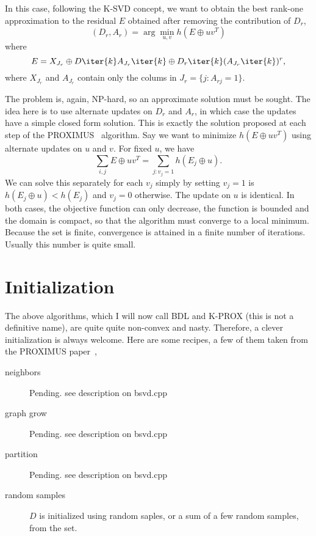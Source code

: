 \documentclass[a4paper,11pt]{article}
\begin{document}
In this case, following the K-SVD concept, we want to obtain the best rank-one approximation to the residual $E$ obtained after removing the contribution of $D_r$, 
\begin{equation}
(D_r,A_r) = \arg\min_{u,v} h(E \oplus uv^T)
\label{eq:bsvd1}
\end{equation}
where
\begin{equation}
E =  X_{J_r} \oplus D\iter{k}A_{J_r}\iter{k} \oplus D_r\iter{k}(A_{J_r}\iter{k})^r,
\label{eq:bsvd2}
\end{equation}
where $X_{J_r}$ and $A_{J_r}$ contain only the colums in $J_r = \{j: A_{rj} = 1 \}$.

The problem   is, again, NP-hard, so an approximate solution must be sought. The idea here is to use alternate updates on $D_r$ and $A_r$, in which case the updates have a simple closed form solution. This is exactly the solution proposed at each step of the PROXIMUS~\cite{proximus} algorithm. Say we want to minimize $h(E \oplus uv^T)$ using alternate updates on $u$ and $v$. For fixed $u$, we have
$$
\sum_{i,j} E \oplus uv^T = \sum_{j: v_j = 1} h(E_j \oplus u).
$$
We can solve this separately for each $v_j$ simply by setting $v_j = 1$ is $h(E_j \oplus u) < h(E_j)$ and $v_j=0$ otherwise. The update on $u$ is identical. In both cases, the objective function can only decrease, the function is bounded and the domain is compact, so that the algorithm must converge to a local minimum. Because the set is finite, convergence is attained in a finite number of iterations. Usually this number is quite small.


\section{Initialization}

The above algorithms, which I will now call BDL and K-PROX (this is not a definitive name), are quite quite non-convex and nasty. Therefore, a clever initialization is always welcome. Here are some recipes, a few of them  taken from the PROXIMUS paper~\cite{proximus},

\begin{description}
\item[neighbors] Pending. see description on bsvd.cpp
\item[graph grow] Pending. see description on bsvd.cpp
\item[partition] Pending. see description on bsvd.cpp
\item[random samples] $D$ is initialized using random saples, or a sum of a few random samples, from the set.
\end{description}
\end{document}
